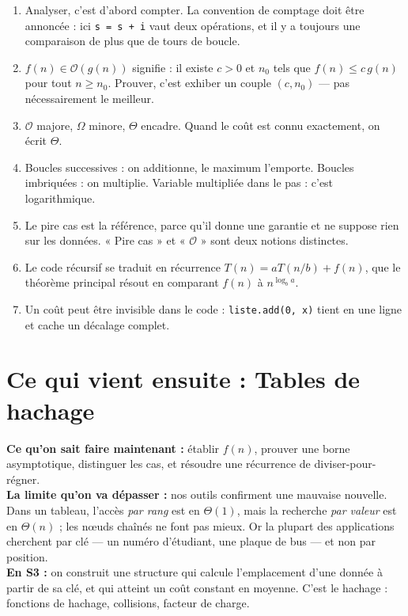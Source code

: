 \documentclass[11pt,a4paper]{article}
\newcommand{\bigO}{\mathcal{O}}
\newcommand{\bigOmega}{\Omega}
\newcommand{\bigTheta}{\Theta}
\theoremstyle{definition}
\theoremstyle{remark}
\begin{document}
\begin{retenirbox}
\begin{enumerate}[nosep]
    \item Analyser, c'est d'abord compter. La convention de comptage doit
          être annoncée : ici \texttt{s = s + i} vaut deux opérations, et il
          y a toujours une comparaison de plus que de tours de boucle.
    \item $f(n) \in \bigO(g(n))$ signifie : il existe $c > 0$ et $n_0$ tels
          que $f(n) \leq c\,g(n)$ pour tout $n \geq n_0$. Prouver, c'est
          exhiber un couple $(c, n_0)$ --- pas nécessairement le meilleur.
    \item $\bigO$ majore, $\bigOmega$ minore, $\bigTheta$ encadre. Quand le
          coût est connu exactement, on écrit $\bigTheta$.
    \item Boucles successives : on additionne, le maximum l'emporte.
          Boucles imbriquées : on multiplie. Variable multipliée dans le
          pas : c'est logarithmique.
    \item Le pire cas est la référence, parce qu'il donne une garantie et
          ne suppose rien sur les données. « Pire cas » et « $\bigO$ » sont
          deux notions distinctes.
    \item Le code récursif se traduit en récurrence $T(n) = aT(n/b) + f(n)$,
          que le théorème principal résout en comparant $f(n)$ à
          $n^{\log_b a}$.
    \item Un coût peut être invisible dans le code : \texttt{liste.add(0, x)}
          tient en une ligne et cache un décalage complet.
\end{enumerate}
\end{retenirbox}

\section*{Ce qui vient ensuite : Tables de hachage}

\begin{prereqbox}
\textbf{Ce qu'on sait faire maintenant :} établir $f(n)$, prouver une borne
asymptotique, distinguer les cas, et résoudre une récurrence de
diviser-pour-régner.\\[4pt]
\textbf{La limite qu'on va dépasser :} nos outils confirment une mauvaise
nouvelle. Dans un tableau, l'accès \emph{par rang} est en $\bigTheta(1)$,
mais la recherche \emph{par valeur} est en $\bigTheta(n)$ ; les nœuds
chaînés ne font pas mieux. Or la plupart des applications cherchent par clé
--- un numéro d'étudiant, une plaque de bus --- et non par position.\\[4pt]
\textbf{En S3 :} on construit une structure qui calcule l'emplacement d'une
donnée à partir de sa clé, et qui atteint un coût constant en moyenne. C'est
le hachage : fonctions de hachage, collisions, facteur de charge.
\end{prereqbox}
\end{document}
